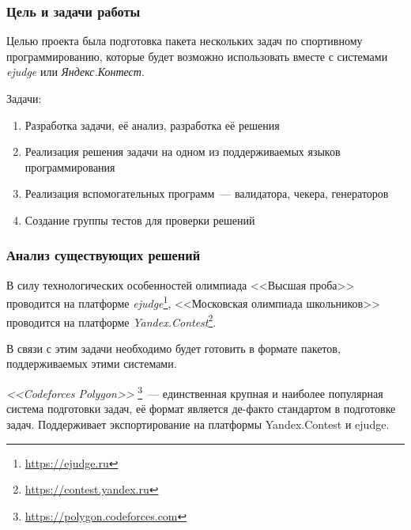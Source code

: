 \documentclass{beamer}
\begin{document}
\begin{frame}
\frametitle{Цель и задачи работы}
Целью проекта была подготовка пакета нескольких задач по спортивному программированию, которые будет возможно использовать вместе с системами \emph{ejudge} или \emph{Яндекс.Контест}.

\bigskip
Задачи:
\begin{enumerate}
\item<1-> Разработка задачи, её анализ, разработка её решения
\item<2-> Реализация решения задачи на одном из поддерживаемых языков программирования
\item<3-> Реализация вспомогательных программ~--- валидатора, чекера, генераторов
\item<4-> Создание группы тестов для проверки решений
\end{enumerate}
\end{frame}








\begin{frame}
\frametitle{Анализ существующих решений}
    \fontsize{12pt}{7.2}\selectfont

В силу технологических особенностей олимпиада <<Высшая проба>> проводится на платформе \emph{ejudge}\footnote{\url{https://ejudge.ru}}, <<Московская олимпиада школьников>> проводится на платформе \emph{Yandex.Contest}\footnote{\url{https://contest.yandex.ru}}. 

\bigskip
В связи с этим задачи необходимо будет готовить в формате пакетов, поддерживаемых этими системами. 

\bigskip
\emph{ <<Codeforces Polygon>> }\footnote{\url{https://polygon.codeforces.com}}~--- единственная крупная и наиболее популярная система подготовки задач, её формат является де-факто стандартом в подготовке задач. Поддерживает экспортирование на платформы Yandex.Contest и ejudge.
\end{frame}
\end{document}
